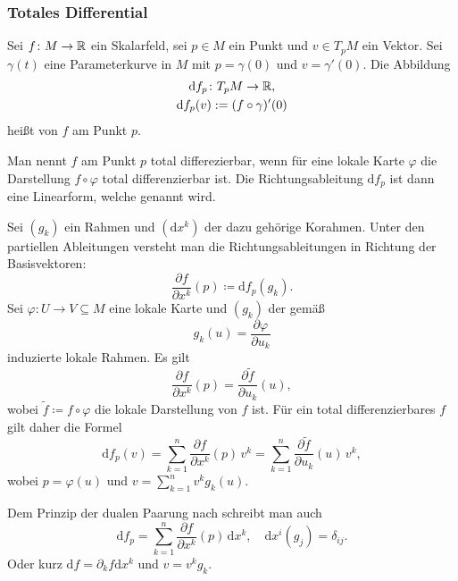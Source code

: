 \subsubsection{Totales Differential}
\begin{definition}[Richtungsableitung]
Sei $f\colon M\to\mathbb R$ ein Skalarfeld, sei $p\in M$ ein Punkt
und $v\in T_p M$ ein Vektor. Sei $\gamma(t)$ eine Parameterkurve in $M$
mit $p=\gamma(0)$ und $v=\gamma'(0)$. Die Abbildung%
\begin{gather}
\mathrm df_p\colon T_p M\to\mathbb R,\\
\mathrm df_p(v) := (f\circ\gamma)'(0)
\end{gather}
heißt  von $f$ am Punkt $p$.
\end{definition}
\begin{definition}
Man nennt $f$ am Punkt $p$ total differezierbar, wenn für eine lokale
Karte $\varphi$ die Darstellung $f\circ\varphi$ total differenzierbar
ist. Die Richtungsableitung $\mathrm df_p$ ist dann eine
Linearform, welche 
genannt wird.
\end{definition}
Sei $(g_k)$ ein Rahmen und $(\mathrm dx^k)$ der dazu gehörige
Korahmen. Unter den partiellen Ableitungen versteht man die
Richtungsableitungen in Richtung der Basisvektoren:%
\begin{equation}
\frac{\partial f}{\partial x^k}(p)\coloneq \mathrm df_p(g_k).
\end{equation}
Sei $\varphi\colon U\to V\subseteq M$ eine lokale Karte und
$(g_k)$ der gemäß%
\begin{equation}
g_k(u) = \frac{\partial\varphi}{\partial u_k}
\end{equation}
induzierte lokale Rahmen. Es gilt
\begin{equation}
\frac{\partial f}{\partial x^k}(p) = \frac{\partial\tilde f}{\partial u_k}(u),
\end{equation}
wobei $\tilde f\coloneq f\circ\varphi$ die
lokale Darstellung von $f$ ist. Für ein total differenzierbares $f$
gilt daher die Formel%
\begin{equation}
\mathrm df_p(v) = \sum_{k=1}^n \frac{\partial f}{\partial x^k}(p)\,v^k
= \sum_{k=1}^n \frac{\partial\tilde f}{\partial u_k}(u)\,v^k,
\end{equation}
wobei $p=\varphi(u)$ und $v=\sum_{k=1}^n v^k g_k(u)$.

Dem Prinzip der dualen Paarung nach schreibt man auch%
\begin{equation}
\mathrm df_p = \sum_{k=1}^n \frac{\partial f}{\partial x^k}(p)\,\mathrm dx^k,\quad
\mathrm dx^i(g_j) = \delta_{ij}.
\end{equation}
Oder kurz $\mathrm df = \partial_k f\mathrm dx^k$ und $v=v^k g_k$.

